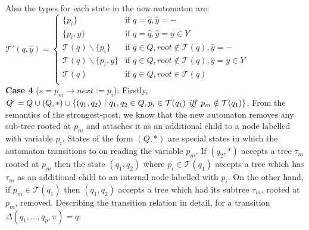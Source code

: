 \documentclass{llncs}
\begin{document}
Also the types for each state in the new automaton are:\\
$\mathcal{T'}(q, \hat{y}) = \begin{cases}
	  \{p_i\} & \text{if $q = \hat{q}, \hat{y} = -$}\\
	  \{p_i, y\} & \text{if $q = \hat{q}, \hat{y} = y \in Y$}\\
        \mathcal{T}(q) \backslash \{p_i\} & \text{if $q \in Q, {root} \notin \mathcal{T}(q), \hat{y} = -$ }\\
        \mathcal{T}(q) \backslash \{p_i, y\} & \text{if $q \in Q, {root} \notin \mathcal{T}(q), \hat{y} = y \in Y$ }\\
	  \mathcal{T}(q)  & \text{if $q \in Q, {root} \in \mathcal{T}(q)$ }\\
	  
      \end{cases}
$\\
\newline\newline
{\bf Case 4} ($s = p_m \rightarrow next := p_i$):
Firstly, $Q' = Q \cup (Q,*) \cup \{(q_1, q_2)~|~q_1, q_2 \in Q, p_i \in \mathcal{T}(q_1) \text{\emph{ iff }} p_m \notin \mathcal{T}(q_1)\}$. 
From the semantics of the strongest-post, we know that the new automaton removes any sub-tree rooted at $p_m$ and attaches it as an additional child to a node labelled with variable $p_i$.
States of the form $(Q,*)$ are special states in which the automaton transitions to on reading the variable $p_m$.
If $(q_2, *)$ accepts a tree $\tau_m$ rooted at $p_m$ then the state $(q_1, q_2)$ where $p_i \in \mathcal{T}(q_1)$ accepts a tree which has $\tau_m$ as an additional child to an internal node labelled with $p_i$. On the other hand, if $p_m \in \mathcal{T}(q_1)$ then $(q_1, q_2)$ accepts a tree which had its subtree $\tau_m$, rooted at $p_m$, removed.
Describing the transition relation in detail, for a transition $\Delta(q_1, ..., q_p, \pi) = q$:
\end{document}
